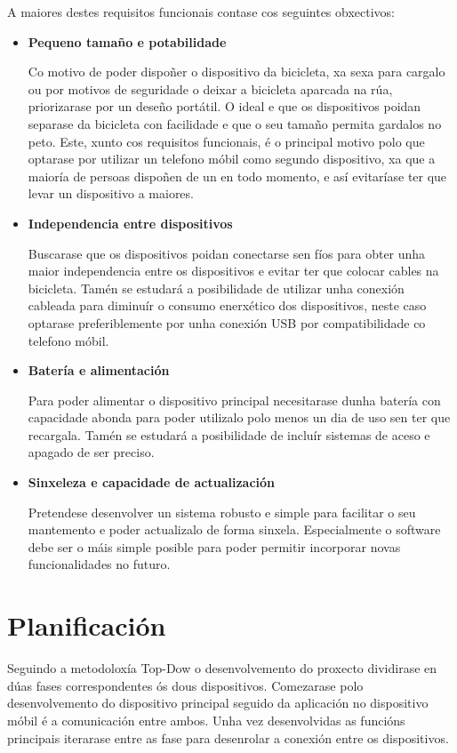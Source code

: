 A maiores destes requisitos funcionais contase cos seguintes obxectivos:
\begin{itemize}
    \item \textbf{Pequeno tamaño e potabilidade}

Co motivo de poder dispoñer o dispositivo da bicicleta, xa sexa para cargalo ou por motivos de seguridade o deixar a bicicleta aparcada na rúa, priorizarase por un deseño portátil. O ideal e que os dispositivos poidan separase da bicicleta con facilidade e que o seu tamaño permita gardalos no peto. Este, xunto cos requisitos funcionais, é o principal motivo polo que optarase por utilizar un telefono móbil como segundo dispositivo, xa que a maioría de persoas dispoñen de un en todo momento, e así evitaríase ter que levar un dispositivo a maiores.

    \item \textbf{Independencia entre dispositivos}

Buscarase que os dispositivos poidan conectarse sen fíos para obter unha maior independencia entre os dispositivos e evitar ter que colocar cables na bicicleta. Tamén se estudará a posibilidade de utilizar unha conexión cableada para diminuír o consumo enerxético dos dispositivos, neste caso optarase preferiblemente por unha conexión USB por compatibilidade co telefono móbil.

    \item \textbf{Batería e alimentación}

Para poder alimentar o dispositivo principal necesitarase dunha batería con capacidade abonda para poder utilizalo polo menos un dia de uso sen ter que recargala. Tamén se estudará a posibilidade de incluír sistemas de aceso e apagado de ser preciso.

    \item \textbf{Sinxeleza e capacidade de actualización}

Pretendese desenvolver un sistema robusto e simple para facilitar o seu mantemento e poder actualizalo de forma sinxela. Especialmente o software debe ser o máis simple posible para poder permitir incorporar novas funcionalidades no futuro.
\end{itemize}
\section{Planificación}

Seguindo a metodoloxía Top-Dow o desenvolvemento do proxecto dividirase en dúas fases correspondentes ós dous dispositivos. Comezarase polo desenvolvemento do dispositivo principal seguido da aplicación no dispositivo móbil é a comunicación entre ambos. Unha vez desenvolvidas as funcións principais iterarase entre as fase para desenrolar a conexión entre os dispositivos.


